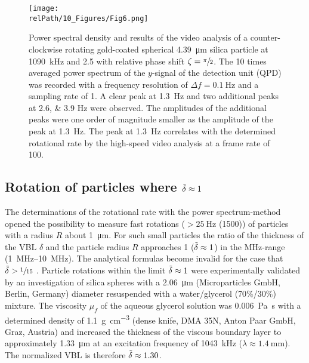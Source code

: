 \begin{figure}
    \centering
    \texttt{[image: \\relPath/10\_Figures/Fig6.png]}
    \caption{Power spectral density and results of the video analysis of a 
      counter-clockwise rotating gold-coated spherical \SI{4.39}{\micro\meter} 
      silica particle at \SI{1090}{\kilo\hertz} and \SI{2.5}{\Vrms} with 
      relative phase shift $\zeta= \sfrac{\pi}{2}$. The 10 times averaged power 
      spectrum of the $y$-signal of the detection unit (QPD) was recorded with a 
      frequency resolution of $\Delta f=\SI{0.1}{\hertz}$ and a sampling rate of 
      \SI{1}{\MS}. A clear peak at \SI{1.3}{\hertz} and two additional peaks at 
      \numlist{2.6; 3.9} \si{\hertz} were observed. The amplitudes of the 
      additional peaks were one order of magnitude smaller as the amplitude of 
      the peak at \SI{1.3}{\hertz}. The peak at \SI{1.3}{\hertz} correlates with 
  the determined rotational rate by the high-speed video analysis at a frame 
  rate of \SI{100}{\fps}.\label{fig:VT-Fig6}}
\end{figure}%

\subsection{Rotation of particles where $\tilde{\delta} \approx 
1$\label{sec:VT-rotationParticles}}

The determinations of the rotational rate with the power spectrum-method opened 
the possibility to measure fast rotations ($>\SI{25}{\hertz}$ (\SI{1500}{\rpm})) 
of particles with a radius $R$ about \SI{1}{\micro\meter}.  For such small 
particles the ratio of the thickness of the VBL $\delta$ and 
the particle radius $R$ approaches 1 ($\tilde{\delta} \approx 1$) in the 
\si{\mega\hertz}-range (\SIrange{1}{10}{\mega\hertz}). The analytical formulas 
become invalid for the case that $\tilde{\delta} > \sfrac{1}{15}$ \cite{Hahn2016}.  
Particle rotations within the limit $\tilde{\delta} \approx 1$ were experimentally 
validated by an investigation of silica spheres with a \SI{2.06}{\micro\meter} 
(Microparticles GmbH, Berlin, Germany) diameter resuspended with a 
water/glycerol (70$\%$/30$\%$) mixture.  The viscosity $\mu_f$ of the aqueous 
glycerol solution was \SI{0.006}{\pascal\second} \cite{Jerome1968} with a 
determined density of \SI{1.1}{\gram\per\centi\meter\cubed} (dense knife, DMA 
35N, Anton Paar GmbH, Graz, Austria) and increased the thickness of the viscous 
boundary layer to approximately \SI{1.33}{\micro\meter} at an excitation 
frequency of \SI{1043}{\kilo\hertz} ($\lambda \approx \SI{1.4}{\mm}$). The 
normalized VBL is therefore $\tilde{\delta} \approx 1.30$.

